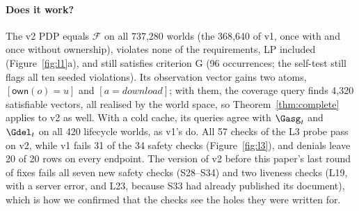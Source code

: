 \paragraph{Does it work?} The v2 PDP equals $\mathcal{F}$ on all 737{,}280 worlds (the 368{,}640 of v1, once
with and once without ownership), violates none of the requirements, LP included (Figure~\ref{fig:l1}a), and
still satisfies criterion G (96 occurrences; the self-test still flags all ten seeded violations). Its observation vector gains two atoms, $[\mathsf{own}(o)=u]$ and $[a=\mathit{download}]$; with them, the
coverage query finds 4{,}320 satisfiable vectors, all realised by the world space, so Theorem~\ref{thm:complete}
applies to v2 as well. With a cold cache, its queries agree with $\Gasg_t$ and $\Gdel_t$ on all 420 lifecycle
worlds, as v1's do. All 57 checks of the L3 probe pass on v2, while v1 fails 31 of the 34 safety checks
(Figure~\ref{fig:l3}), and denials leave 20 of 20 rows on every endpoint. The version of v2 before this paper's last
round of fixes fails all seven new safety checks (S28--S34) and two liveness checks (L19, with a server error,
and L23, because S33 had already published its document), which is how we confirmed that the checks see the holes
they were written for.

